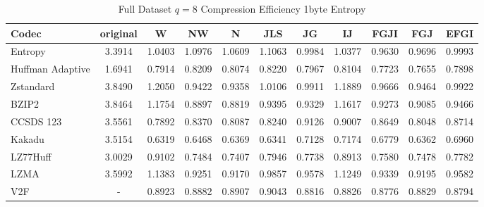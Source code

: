 \documentclass{article}
\begin{document}
\begin{table}[h!]
\centering
\caption{Full Dataset $q=8$ Compression Efficiency 1byte Entropy}
\begin{tabular}{|l|cccccccccc|}
\hline
Codec &  original &      W &     NW &      N &    JLS &     JG &     IJ &   FGJI &    FGJ &   EFGI \\
\hline
Entropy & 3.3914 & 1.0403 & 1.0976 & 1.0609 & 1.1063 & 0.9984 & 1.0377 & 0.9630 & 0.9696 & 0.9993 \\
\hline
Huffman Adaptive &    1.6941 & 0.7914 & 0.8209 & 0.8074 & 0.8220 & 0.7967 & 0.8104 & 0.7723 & 0.7655 & 0.7898 \\
Zstandard        &    3.8490 & 1.2050 & 0.9422 & 0.9358 & 1.0106 & 0.9911 & 1.1889 & 0.9666 & 0.9464 & 0.9922 \\
BZIP2            &    3.8464 & 1.1754 & 0.8897 & 0.8819 & 0.9395 & 0.9329 & 1.1617 & 0.9273 & 0.9085 & 0.9466 \\
CCSDS 123        &    3.5561 & 0.7892 & 0.8370 & 0.8087 & 0.8240 & 0.9126 & 0.9007 & 0.8649 & 0.8048 & 0.8714 \\
Kakadu           &    3.5154 & 0.6319 & 0.6468 & 0.6369 & 0.6341 & 0.7128 & 0.7174 & 0.6779 & 0.6362 & 0.6960 \\
LZ77Huff         &    3.0029 & 0.9102 & 0.7484 & 0.7407 & 0.7946 & 0.7738 & 0.8913 & 0.7580 & 0.7478 & 0.7782 \\
LZMA             &    3.5992 & 1.1383 & 0.9251 & 0.9170 & 0.9857 & 0.9578 & 1.1249 & 0.9339 & 0.9195 & 0.9582 \\
V2F              &    - & 0.8923 & 0.8882 & 0.8907 & 0.9043 & 0.8816 & 0.8826 & 0.8776 & 0.8829 & 0.8794 \\
\hline
\end{tabular}
\end{table}
\end{document}
